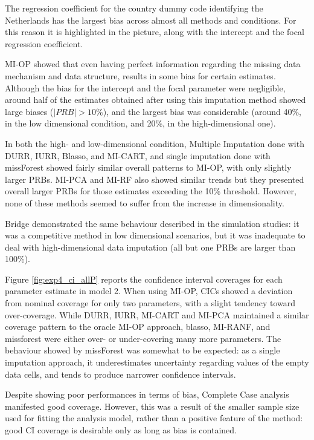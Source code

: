 	The regression coefficient for the country dummy code identifying the Netherlands has the largest
	bias across almost all methods and conditions.
	For this reason it is highlighted in the picture, along with the intercept and the focal regression 
	coefficient.

	MI-OP showed that even having perfect information regarding the missing data mechanism and data structure,
	results in some bias for certain estimates.
	Although the bias for the intercept and the focal parameter were negligible, around half of the estimates 
	obtained after using this imputation method showed large biases ($|PRB|>10\%$), and the largest bias was 
	considerable (around 40\%, in the low dimensional condition, and 20\%, in the high-dimensional one).
	
	In both the high- and low-dimensional condition, Multiple Imputation done with DURR, IURR, Blasso, and 
	MI-CART, and single imputation done with missForest showed fairly similar overall patterns to MI-OP, 
	with only slightly larger PRBs.
	MI-PCA and MI-RF also showed similar trends but they presented overall larger PRBs for those estimates 
	exceeding the 10\% threshold.
	However, none of these methods seemed to suffer from the increase in dimensionality.

	Bridge demonstrated the same behaviour described in the simulation studies: it was a competitive method in 
	low dimensional scenarios, but it was inadequate to deal with high-dimensional data imputation (all but 
	one PRBs are larger than 100\%).

	Figure \ref{fig:exp4_ci_allP} reports the confidence interval coverages for each parameter estimate in model 2.
	When using MI-OP, CICs showed a deviation from nominal coverage for only two parameters, with a slight 
	tendency toward over-coverage.
	While DURR, IURR, MI-CART and MI-PCA maintained a similar coverage pattern to the oracle MI-OP approach, 
	blasso, MI-RANF, and missforest were either over- or under-covering many more parameters.
	The behaviour showed by missForest was somewhat to be expected: as a single imputation approach, it 
	underestimates uncertainty regarding values of the empty data cells, and tends to produce narrower
	confidence intervals.

	Despite showing poor performances in terms of bias, Complete Case analysis manifested good 
	coverage.
	However, this was a result of the smaller sample size used for fitting the analysis model, rather than 
	a positive feature of the method: good CI coverage is desirable only as long as bias is contained.

